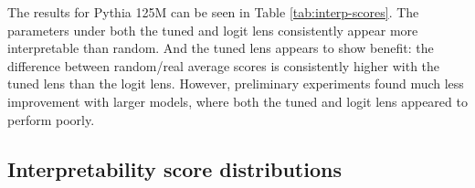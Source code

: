 \documentclass{article}
\theoremstyle{plain}
\theoremstyle{definition}
\begin{document}
\begin{table}[t]
\centering
{}
\vspace*{-.1in}
\caption{The mean interpretability scores (as measured in \cref{app:static-analysis:automated}) for Pythia 125M, with several different interpretability techniques \citep{millidge2022svd, geva2020transformer}, comparing both the tuned lens and logit lens to randomly generated matrices. Where applicable, the notation (L) and (R) indicates that the results are for the left and right singular vectors, respectively.}
\label{tab:interp-scores}
\end{table}


The results for Pythia 125M can be seen in Table \ref{tab:interp-scores}. The parameters under both the tuned and logit lens consistently appear more interpretable than random. And the tuned lens appears to show benefit: the difference between random/real average scores is consistently higher with the tuned lens than the logit lens. However, preliminary experiments found much less improvement with larger models, where both the tuned and logit lens appeared to perform poorly.

\subsection{Interpretability score distributions}
\label{app:static-analysis:distributions}
\end{document}
